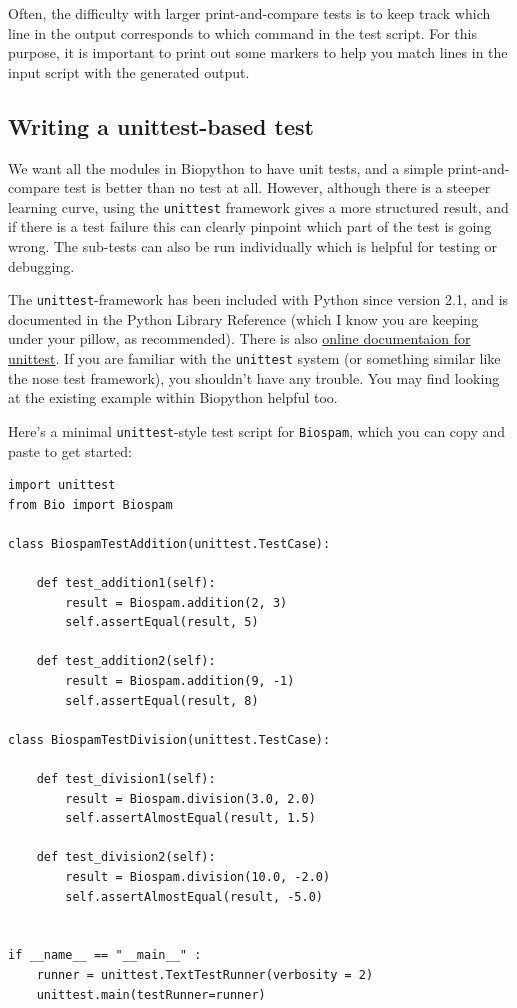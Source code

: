 \documentclass{report}
\begin{document}
Often, the difficulty with larger print-and-compare tests is to keep track which line in the output corresponds to which command in the test script. For this purpose, it is important to print out some markers to help you match lines in the input script with the generated output.

\subsection{Writing a unittest-based test}

We want all the modules in Biopython to have unit tests, and a simple
print-and-compare test is better than no test at all.  However, although
there is a steeper learning curve, using the \verb|unittest| framework
gives a more structured result, and if there is a test failure this can
clearly pinpoint which part of the test is going wrong.  The sub-tests can
also be run individually which is helpful for testing or debugging.

The \verb|unittest|-framework has been included with Python since version
2.1, and is documented in the Python Library Reference (which I know you
are keeping under your pillow, as recommended).  There is also
\href{http://docs.python.org/library/unittest.html}{online documentaion
for unittest}.
If you are familiar with the \verb|unittest| system (or something similar
like the nose test framework), you shouldn't have any trouble.  You may
find looking at the existing example within Biopython helpful too.

Here's a minimal \verb|unittest|-style test script for \verb|Biospam|,
which you can copy and paste to get started:

\begin{verbatim}
import unittest
from Bio import Biospam

class BiospamTestAddition(unittest.TestCase):

    def test_addition1(self):
        result = Biospam.addition(2, 3)
        self.assertEqual(result, 5)

    def test_addition2(self):
        result = Biospam.addition(9, -1)
        self.assertEqual(result, 8)

class BiospamTestDivision(unittest.TestCase):

    def test_division1(self):
        result = Biospam.division(3.0, 2.0)
        self.assertAlmostEqual(result, 1.5)

    def test_division2(self):
        result = Biospam.division(10.0, -2.0)
        self.assertAlmostEqual(result, -5.0)


if __name__ == "__main__" :
    runner = unittest.TextTestRunner(verbosity = 2)
    unittest.main(testRunner=runner)
\end{verbatim}
\end{document}
